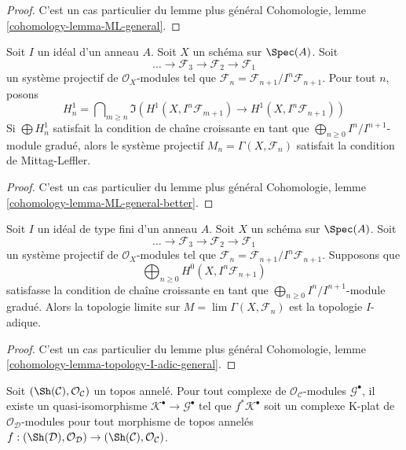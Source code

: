 \begin{proof}
C'est un cas particulier du lemme plus général
Cohomologie, lemme \ref{cohomology-lemma-ML-general}.
\end{proof}

\begin{lemma}
\label{lemma-ML-general-better}
Soit $I$ un idéal d'un anneau $A$. Soit $X$ un schéma sur $\Spec(A)$. Soit
$$
\ldots \to \mathcal{F}_3 \to \mathcal{F}_2 \to \mathcal{F}_1
$$
un système projectif de $\mathcal{O}_X$-modules tel que
$\mathcal{F}_n = \mathcal{F}_{n + 1}/I^n\mathcal{F}_{n + 1}$.
Pour tout $n$, posons
$$
H^1_n =
\bigcap\nolimits_{m \geq n}
\Im\left(
H^1(X, I^n\mathcal{F}_{m + 1}) \to H^1(X, I^n\mathcal{F}_{n + 1})
\right)
$$
Si $\bigoplus H^1_n$ satisfait la condition de chaîne croissante en tant que
$\bigoplus_{n \geq 0} I^n/I^{n + 1}$-module gradué, alors le système
projectif $M_n = \Gamma(X, \mathcal{F}_n)$ satisfait la condition
de Mittag-Leffler.
\end{lemma}

\begin{proof}
C'est un cas particulier du lemme plus général
Cohomologie, lemme \ref{cohomology-lemma-ML-general-better}.
\end{proof}

\begin{lemma}
\label{lemma-topology-I-adic-general}
Soit $I$ un idéal de type fini d'un anneau $A$.
Soit $X$ un schéma sur $\Spec(A)$. Soit
$$
\ldots \to \mathcal{F}_3 \to \mathcal{F}_2 \to \mathcal{F}_1
$$
un système projectif de $\mathcal{O}_X$-modules tel que
$\mathcal{F}_n = \mathcal{F}_{n + 1}/I^n\mathcal{F}_{n + 1}$.
Supposons que
$$
\bigoplus\nolimits_{n \geq 0} H^0(X, I^n\mathcal{F}_{n + 1})
$$
satisfasse la condition de chaîne croissante en tant que
$\bigoplus_{n \geq 0} I^n/I^{n + 1}$-module gradué.
Alors la topologie limite sur $M = \lim \Gamma(X, \mathcal{F}_n)$
est la topologie $I$-adique.
\end{lemma}

\begin{proof}
C'est un cas particulier du lemme plus général
Cohomologie, lemme \ref{cohomology-lemma-topology-I-adic-general}.
\end{proof}

\begin{lemma}
\label{lemma-pullback-K-flat}
Soit $(\Sh(\mathcal{C}), \mathcal{O}_\mathcal{C})$ un topos annelé.
Pour tout complexe de $\mathcal{O}_\mathcal{C}$-modules
$\mathcal{G}^\bullet$, il existe un quasi-isomorphisme
$\mathcal{K}^\bullet \to \mathcal{G}^\bullet$ tel que
$f^*\mathcal{K}^\bullet$ soit un complexe K-plat de
$\mathcal{O}_\mathcal{D}$-modules pour tout morphisme de topos annelés
$f : (\Sh(\mathcal{D}), \mathcal{O}_\mathcal{D}) \to
(\Sh(\mathcal{C}), \mathcal{O}_\mathcal{C})$.
\end{lemma}

